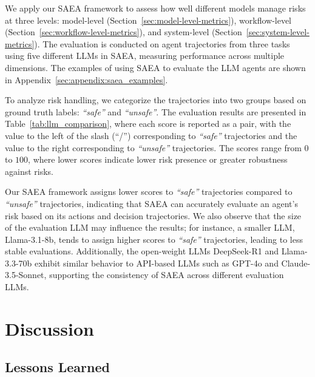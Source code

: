 

We apply our SAEA framework to assess how well different models manage risks at three levels: model-level (Section~\ref{sec:model-level-metrics}), workflow-level (Section~\ref{sec:workflow-level-metrics}), and system-level (Section~\ref{sec:system-level-metrics}). The evaluation is conducted on agent trajectories from three tasks using five different LLMs in SAEA, measuring performance across multiple dimensions. The examples of using SAEA to evaluate the LLM agents are shown in Appendix~\ref{sec:appendix:saea_examples}.

To analyze risk handling, we categorize the trajectories into two groups based on ground truth labels: \textit{``safe''} and \textit{``unsafe''}. The evaluation results are presented in Table~\ref{tab:llm_comparison}, where each score is reported as a pair, with the value to the left of the slash (``/'') corresponding to \textit{``safe''} trajectories and the value to the right corresponding to \textit{``unsafe''} trajectories. The scores range from $0$ to $100$, where lower scores indicate lower risk presence or greater robustness against risks.

Our SAEA framework assigns lower scores to \textit{``safe''} trajectories compared to \textit{``unsafe''} trajectories, indicating that SAEA can accurately evaluate an agent's risk based on its actions and decision trajectories. We also observe that the size of the evaluation LLM may influence the results; for instance, a smaller LLM, {Llama-3.1-8b}, tends to assign higher scores to \textit{``safe''} trajectories, leading to less stable evaluations. Additionally, the open-weight LLMs {DeepSeek-R1} and {Llama-3.3-70b} exhibit similar behavior to API-based LLMs such as {GPT-4o} and {Claude-3.5-Sonnet}, supporting the consistency of SAEA across different evaluation LLMs. 




\vspace{-10pt}
\section{Discussion}


\subsection{Lessons Learned}


